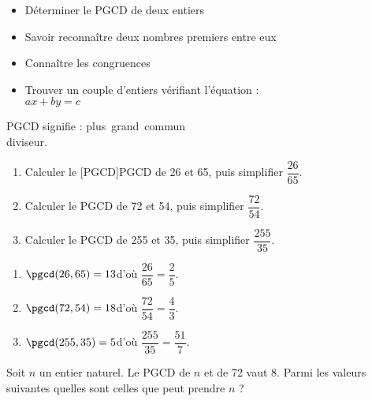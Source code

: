 \begin{prerequis}
\begin{itemize}
\item Déterminer le PGCD de deux entiers
\item Savoir reconnaître deux nombres premiers entre eux
\item Connaître les congruences
\item Trouver un couple d'entiers vérifiant l'équation :\\ $ax+by=c$
\end{itemize}
\end{prerequis}
 
\vspace{0.5em}
% 
\begin{autoeval}
\begin{multicols}{2}
	\begin{exercice}
          \og{}PGCD\fg{} signifie :
          \og{}plus~grand~commun\\diviseur\fg{}.
	\begin{enumerate}
	\item Calculer le \MotDefinition[PGCD]{}[PGCD]{}PGCD de 26 et 65, puis simplifier  $\dfrac{26}{65}$.\vspace{5pt}
	\item Calculer le PGCD de 72 et 54, puis simplifier  $\dfrac{72}{54}$.\vspace{5pt}
	\item Calculer le PGCD de 255 et 35, puis simplifier $\dfrac{255}{35}$.
	\end{enumerate}
	\end{exercice}
        \begin{corrige}
          \begin{enumerate}
          \item $\pgcd(26,65)=13$\enskip d'où \enskip
            $\dfrac{26}{65}=\dfrac{2}{5}$.\medskip
          \item $\pgcd(72,54)=18$\enskip d'où \enskip
            $\dfrac{72}{54}=\dfrac{4}{3}$.\medskip
          \item $\pgcd(255,35)=5$\enskip d'où \enskip
            $\dfrac{255}{35}=\dfrac{51}{7}$.
          \end{enumerate}
        \end{corrige}
        \smallskip{}
	
	\begin{exercice}
          Soit $n$ un entier naturel. Le PGCD de $n$ et de 72 vaut
          8. Parmi les valeurs suivantes quelles sont celles que peut
          prendre $n$ ?


\end{exercice}
\end{multicols}
\end{autoeval}
